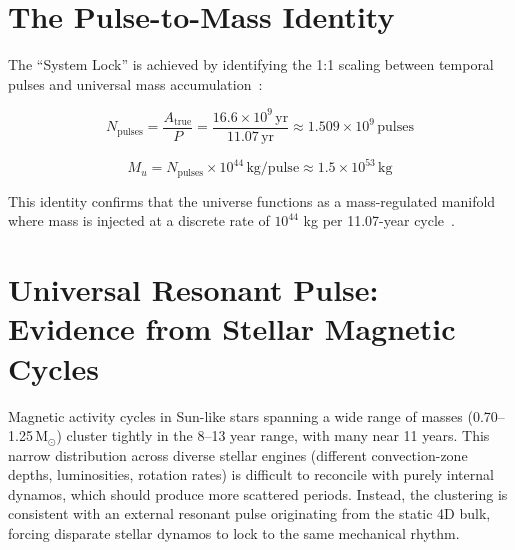 \documentclass[12pt]{article}
\begin{document}
\section{The Pulse-to-Mass Identity}
The ``System Lock'' is achieved by identifying the 1:1 scaling between temporal pulses and universal mass accumulation~\cite{20}:

\begin{equation}
N_{\mathrm{pulses}} = \frac{A_{\mathrm{true}}}{P} = \frac{16.6 \times 10^9 \, \mathrm{yr}}{11.07 \, \mathrm{yr}} \approx 1.509 \times 10^9 \, \mathrm{pulses}
\end{equation}

\begin{equation}
M_{u} = N_{\mathrm{pulses}} \times 10^{44} \, \mathrm{kg/pulse} \approx 1.5 \times 10^{53} \, \mathrm{kg}
\end{equation}

This identity confirms that the universe functions as a mass-regulated manifold where mass is injected at a discrete rate of $10^{44}$ kg per 11.07-year cycle~\cite{29}.

\section{Universal Resonant Pulse: Evidence from Stellar Magnetic Cycles}
Magnetic activity cycles in Sun-like stars spanning a wide range of masses (0.70--1.25\,M$_\odot$) cluster tightly in the 8--13 year range, with many near 11 years. This narrow distribution across diverse stellar engines (different convection-zone depths, luminosities, rotation rates) is difficult to reconcile with purely internal dynamos, which should produce more scattered periods. Instead, the clustering is consistent with an external resonant pulse originating from the static 4D bulk, forcing disparate stellar dynamos to lock to the same mechanical rhythm.
\newline
\end{document}
